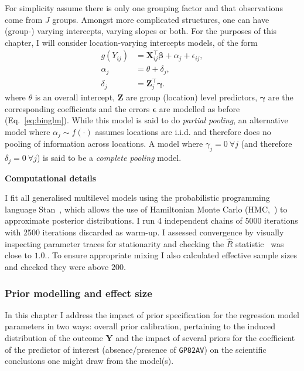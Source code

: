 For simplicity assume there is only one grouping factor and that observations come from $J$ groups.
Amongst more complicated structures, one can have (group-) varying intercepts, varying slopes or both.
For the purposes of this chapter, I will consider location-varying intercepts models, of the form
\begin{align}
 \label{eq:varyingintA}
  g(Y_{ij}) &= \boldsymbol X_{ij}^\intercal \boldsymbol\beta + \alpha_j  + \epsilon_{ij},\\
  \alpha_j &= \theta + \delta_j, \\
   \label{eq:varyingintB}
  \delta_j &= \boldsymbol Z_j^\intercal \boldsymbol\gamma.
\end{align}
where $\theta$ is an overall intercept, $\boldsymbol Z$ are group (location) level predictors, $\boldsymbol\gamma$ are the corresponding coefficients and the errors $\boldsymbol\epsilon$ are modelled as before (Eq.~\ref{eq:binglm}).
While this model is said to do \textit{partial pooling}, an alternative model where $\alpha_j\sim f(\cdot)$ assumes locations are i.i.d. and therefore does no pooling of information across locations.
A model where $\gamma_j = 0 \: \forall j$ (and therefore $\delta_j = 0 \: \forall j$) is said to be a \textit{complete pooling} model.

\textbf{Computational details}

I fit all generalised multilevel models using the probabilistic programming language Stan~\citep{Carpenter2017}, which allows the use  of Hamiltonian Monte Carlo (HMC,~\cite{Neal2011}) to approximate posterior distributions.
I run 4 independent chains of 5000 iterations with 2500 iterations discarded as warm-up.
I assessed convergence by visually inspecting parameter traces for stationarity and checking the $\hat{R}$ statistic~\citep{Brooks1998} was close to $1.0$..
To ensure appropriate mixing I also calculated effective sample sizes and checked they were above $200$.

\subsubsection{Prior modelling and effect size}
\label{sec:priors}

In this chapter I address the impact of prior specification for the regression model parameters in two ways: overall prior calibration, pertaining to the induced distribution of the outcome $\boldsymbol Y$ and the impact of several priors for the coefficient of the predictor of interest (absence/presence of \verb|GP82AV|) on the scientific conclusions one might draw from the model(s).

